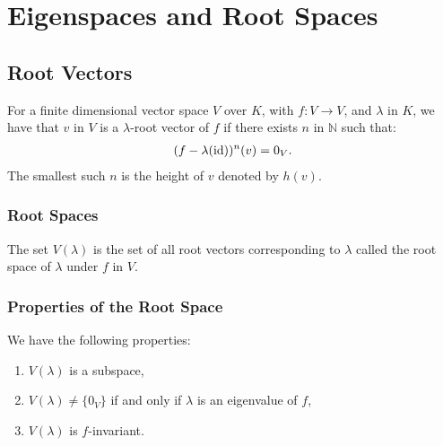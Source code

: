 \section{Eigenspaces and Root Spaces}

\subsection{Root Vectors}

For a finite dimensional vector space $V$ over $K$, with $f : V \to V$, 
and $\lambda$ in $K$, we have that $v$ in $V$ is a $\lambda$-root vector 
of $f$ if there exists $n$ in $\mathbb{N}$ such that: \begin{gather*}
  (f - \lambda(\operatorname{id}))^n(v) = 0_V.
\end{gather*} The smallest such $n$ is the height of $v$ denoted by $h(v)$.

\subsubsection{Root Spaces}

The set $V(\lambda)$ is the set of all root vectors corresponding to 
$\lambda$ called the root space of $\lambda$ under $f$ in $V$.

\subsubsection{Properties of the Root Space}

We have the following properties: \begin{enumerate}
  \item $V(\lambda)$ is a subspace,
  \item $V(\lambda) \neq \{0_V\}$ if and only if $\lambda$ is an eigenvalue 
  of $f$,
  \item $V(\lambda)$ is $f$-invariant.
\end{enumerate}

